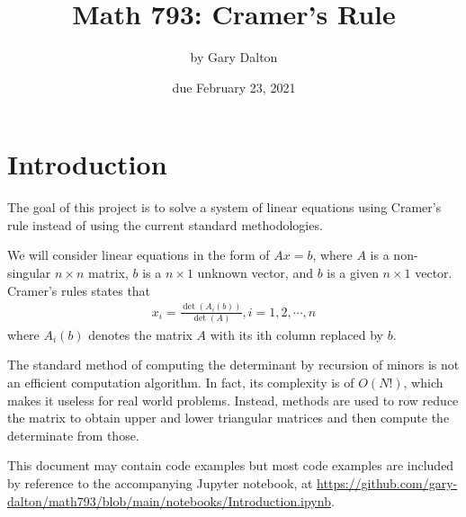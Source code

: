 \documentclass[12pt]{article}
\begin{document}
\title{\vspace{-5ex}Math 793: Cramer's Rule}
\author{by Gary Dalton}
\date{\vspace{-3ex}due February 23, 2021}
\maketitle

\section{Introduction}
The goal of this project is to solve a system of linear equations using Cramer's rule instead of using the current standard methodologies.

We will consider linear equations in the form of $Ax=b$, where $A$ is a non-singular $n\times n$ matrix, $b$ is a $n\times 1$ unknown vector, and $b$ is a given $n\times 1$ vector. Cramer's rules states that
\begin{align*}
	x_i = \frac{\det(A_i(b))}{\det(A)}, i=1,2,\cdots,n
\end{align*}
where $A_i(b)$ denotes the matrix $A$ with its ith column replaced by $b$.

The standard method of computing the determinant by recursion of minors is not an efficient computation algorithm. In fact, its complexity is of $O(N!)$, which makes it useless for real world problems. Instead, methods are used to row reduce the matrix to obtain upper and lower triangular matrices and then compute the determinate from those.

This document may contain code examples but most code examples are included by reference to the accompanying Jupyter notebook, at \url{https://github.com/gary-dalton/math793/blob/main/notebooks/Introduction.ipynb}.
\end{document}
